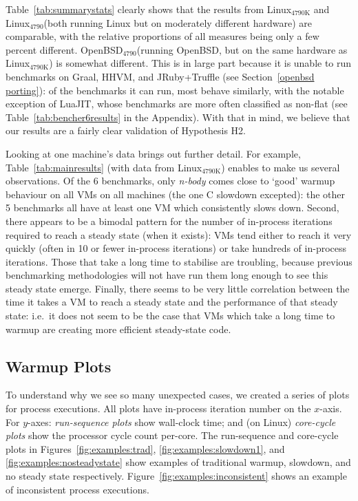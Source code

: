 \documentclass[preprint,numbers,10pt]{sigplanconf}
\newcommand{\nbody}{\emph{n-body}\xspace}
\newcommand{\bencherthree}{Linux$_\mathrm{4790K}$\xspace}
\newcommand{\bencherfive}{Linux$_\mathrm{4790}$\xspace}
\newcommand{\benchersix}{OpenBSD$_\mathrm{4790}$\xspace}
\begin{document}
Table~\ref{tab:summarystats} clearly shows that the results from \bencherthree
and \bencherfive (both running Linux but on moderately different hardware) are
comparable, with the relative proportions of all measures being only a few
percent different. \benchersix (running OpenBSD, but on the same hardware as
\bencherthree) is somewhat different. This is in large part because it
is unable to run benchmarks on Graal, HHVM, and JRuby+Truffle (see
Section~\ref{openbsd porting}): of the benchmarks it can run, most behave
similarly, with the notable exception of LuaJIT, whose benchmarks are more often
classified as non-flat (see Table~\ref{tab:bencher6results} in the Appendix).
With that in mind, we believe that our results are a fairly clear validation of
Hypothesis H2.

Looking at one machine's data brings out further detail. For
example, Table~\ref{tab:mainresults} (with data from \bencherthree)
enables to make us several observations. Of the 6 benchmarks, only \nbody comes
close to `good' warmup behaviour on all
VMs on all machines (the one C slowdown excepted): the other 5 benchmarks all have at least one VM which consistently
slows down. Second, there appears to be a bimodal pattern for the number
of in-process iterations required to reach a steady state (when it exists): VMs
tend either to reach it very quickly (often in 10 or fewer in-process iterations)
or take hundreds of in-process iterations. Those that take a long time
to stabilise are troubling, because previous benchmarking methodologies
will not have run them long enough to see this steady state emerge.
Finally, there seems to be very little
correlation between the time it takes a VM to reach a steady state and the
performance of that steady state: i.e.~it does not seem to be the case that VMs
which take a long time to warmup are creating more efficient
steady-state code.


\subsection{Warmup Plots}

To understand why we see so many unexpected cases, we created a series of plots
for process executions. All
plots have in-process iteration number on the $x$-axis. For $y$-axes:
\emph{run-sequence plots} show wall-clock time; and (on Linux) \emph{core-cycle plots} show
the processor cycle count per-core.
The run-sequence and core-cycle plots in Figures~\ref{fig:examples:trad}, \ref{fig:examples:slowdown1},
and \ref{fig:examples:nosteadystate} show examples of traditional warmup, slowdown,
and no steady state respectively. Figure~\ref{fig:examples:inconsistent} shows
an example of inconsistent process executions.
\end{document}
